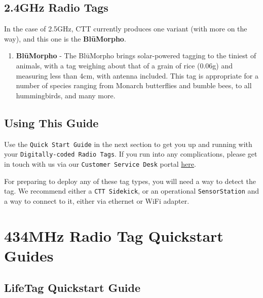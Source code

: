 \documentclass[
]{article}
\providecommand{\tightlist}{%
  \setlength{\itemsep}{0pt}\setlength{\parskip}{0pt}}
\begin{document}
\hypertarget{ghz-radio-tags}{%
\subsection{2.4GHz Radio Tags}\label{ghz-radio-tags}}

In the case of 2.5GHz, CTT currently produces one variant (with more on
the way), and this one is the \textbf{BlūMorpho}.

\begin{enumerate}
\def\labelenumi{\arabic{enumi}.}
\tightlist
\item
  \textbf{BlūMorpho} - The BlūMorpho brings solar-powered tagging to the
  tiniest of animals, with a tag weighing about that of a grain of rice
  (0.06g) and measuring less than 4cm, with antenna included. This tag
  is appropriate for a number of species ranging from Monarch
  butterflies and bumble bees, to all hummingbirds, and many more.
\end{enumerate}

\hypertarget{using-this-guide}{%
\subsection{Using This Guide}\label{using-this-guide}}

Use the \texttt{Quick\ Start\ Guide} in the next section to get you up
and running with your \texttt{Digitally-coded\ Radio\ Tags}. If you run
into any complications, please get in touch with us via our
\texttt{Customer\ Service\ Desk} portal
\href{https://celltracktech.com/pages/customer-service-desk-csd}{here}.

For preparing to deploy any of these tag types, you will need a way to
detect the tag. We recommend either a \texttt{CTT\ Sidekick}, or an
operational \texttt{SensorStation} and a way to connect to it, either
via ethernet or WiFi adapter.

\hypertarget{mhz-radio-tag-quickstart-guides}{%
\section{434MHz Radio Tag Quickstart
Guides}\label{mhz-radio-tag-quickstart-guides}}

\hypertarget{lifetag-quickstart-guide}{%
\subsection{LifeTag Quickstart Guide}\label{lifetag-quickstart-guide}}
\end{document}
